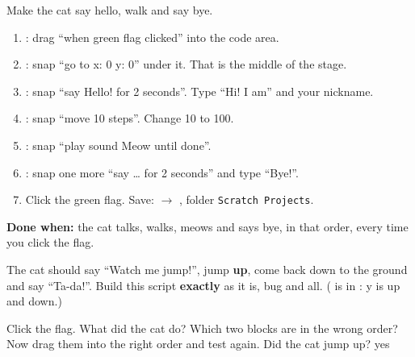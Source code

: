 \begin{exercise}
Make the cat say hello, walk and say bye.
\begin{enumerate}[leftmargin=1.4em,itemsep=1pt]
  \item {}: drag \enquote{when green flag clicked} into the code area.
  \item {}: snap \enquote{go to x: 0 y: 0} under it. That is the middle of the stage.
  \item {}: snap \enquote{say Hello! for 2 seconds}. Type \enquote{Hi! I am} and your nickname.
  \item {}: snap \enquote{move 10 steps}. Change 10 to 100.
  \item {}: snap \enquote{play sound Meow until done}.
  \item {}: snap one more \enquote{say \ldots{} for 2 seconds} and type \enquote{Bye!}.
  \item Click the green flag. Save:  $\rightarrow$ , folder \texttt{Scratch Projects}.
\end{enumerate}
\begin{center}
\begin{scratch}[scale=0.85]
\end{scratch}
\end{center}
\textbf{Done when:} the cat talks, walks, meows and says bye, in that order, every time you click the flag.
\end{exercise}

\begin{exercise}
The cat should say \enquote{Watch me jump!}, jump \textbf{up}, come back down to the ground and say \enquote{Ta-da!}.
Build this script \textbf{exactly} as it is, bug and all. ( is in : y is up and down.)
\begin{center}
\begin{scratch}[scale=0.85]
\end{scratch}
\end{center}
Click the flag. What did the cat do? 
Which two blocks are in the wrong order? 
Now drag them into the right order and test again. Did the cat jump up? \tickbox{} yes
\end{exercise}

